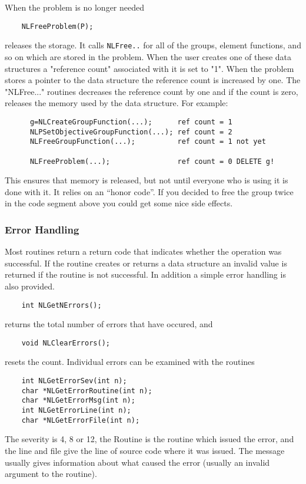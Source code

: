\documentclass[12pt]{article}
\begin{document}
   When the problem is no longer needed 
   \begin{verbatim}
    NLFreeProblem(P);
   \end{verbatim}
   releases the storage. It calls {\tt NLFree..} for all of the groups, element functions, and so on which are stored
   in the problem. When the user creates one of these data structures a "reference count"  associated  with it
   is set to "1". When the problem stores a pointer to the data structure the reference count is increased by one. The
   "NLFree..." routines decreases the reference count by one and if the count is zero, releases the memory used by the
   data structure. For example:
   \begin{verbatim}
      g=NLCreateGroupFunction(...);      ref count = 1
      NLPSetObjectiveGroupFunction(...); ref count = 2
      NLFreeGroupFunction(...);          ref count = 1 not yet

      NLFreeProblem(...);                ref count = 0 DELETE g!
   \end{verbatim}
   This ensures that memory is released, but not until everyone who is using it is done with it. It relies on
   an ``honor code''. If you decided to free the group twice in the code segment above you could get some nice
   side effects.
   
   \subsubsection{Error Handling}

   Most routines return a return code that indicates whether the operation was successful. If the routine creates
   or returns a data structure an invalid value is returned if the routine is not successful. In addition a simple
   error handling is also provided. 
   \begin{verbatim}
    int NLGetNErrors();
   \end{verbatim}
   returns the total number of errors that have occured, and
   \begin{verbatim}
    void NLClearErrors();
   \end{verbatim}
   resets the count. Individual errors can be examined with the routines
   \begin{verbatim}
    int NLGetErrorSev(int n);
    char *NLGetErrorRoutine(int n);
    char *NLGetErrorMsg(int n);
    int NLGetErrorLine(int n);
    char *NLGetErrorFile(int n);
   \end{verbatim}
   The severity is 4, 8 or 12, the Routine is the routine which issued the error, and the line and file give the
   line of source code where it was issued. The message usually gives information about what caused the
   error (usually an invalid argument to the routine).
\end{document}
